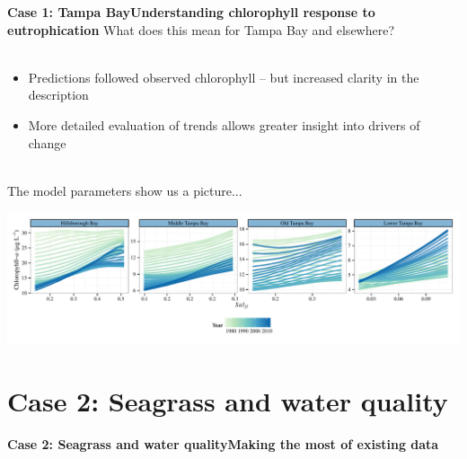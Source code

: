 \documentclass[serif]{beamer}\usepackage[]{graphicx}\usepackage[]{color}
\begin{document}
\begin{frame}{\textbf{Case 1: Tampa Bay}}{\textbf{Understanding chlorophyll response to eutrophication}}
\onslide<+->
What does this mean for Tampa Bay and elsewhere?\\~\\
\begin{itemize}
\item Predictions followed observed chlorophyll -- but increased clarity in the description
\item More detailed evaluation of trends allows greater insight into drivers of change\\~\\
\end{itemize}
\onslide<+->
The model parameters show us a picture...
\centerline{\includegraphics[width = \textwidth]{fig/title_plo.pdf}}
\end{frame}

\section{Case 2: Seagrass and water quality}

\begin{frame}{\textbf{Case 2: Seagrass and water quality}}{\textbf{Making the most of existing data}}

\end{frame}
\end{document}

